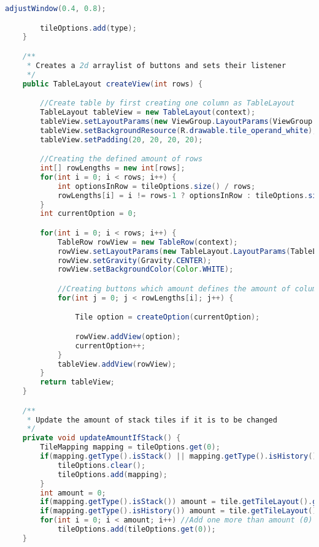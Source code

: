 \begin{lstlisting}[caption=InputTileMapping,label=list:InputTileMapping,language=Java]
        adjustWindow(0.4, 0.8);

        tileOptions.add(type);
    }

    /**
     * Creates a 2d arraylist of buttons and sets their listener
     */
    public TableLayout createView(int rows) {

        //Create table by first creating one column as TableLayout
        TableLayout tableView = new TableLayout(context);
        tableView.setLayoutParams(new ViewGroup.LayoutParams(ViewGroup.LayoutParams.MATCH_PARENT, ViewGroup.LayoutParams.MATCH_PARENT));
        tableView.setBackgroundResource(R.drawable.tile_operand_white);
        tableView.setPadding(20, 20, 20, 20);

        //Creating the defined amount of rows
        int[] rowLengths = new int[rows];
        for(int i = 0; i < rows; i++) {
            int optionsInRow = tileOptions.size() / rows;
            rowLengths[i] = i != rows-1 ? optionsInRow : tileOptions.size() - (optionsInRow * i);
        }
        int currentOption = 0;

        for(int i = 0; i < rows; i++) {
            TableRow rowView = new TableRow(context);
            rowView.setLayoutParams(new TableLayout.LayoutParams(TableLayout.LayoutParams.MATCH_PARENT, TableLayout.LayoutParams.MATCH_PARENT, 1.0f));
            rowView.setGravity(Gravity.CENTER);
            rowView.setBackgroundColor(Color.WHITE);

            //Creating buttons which amount defines the amount of columns
            for(int j = 0; j < rowLengths[i]; j++) {

                Tile option = createOption(currentOption);

                rowView.addView(option);
                currentOption++;
            }
            tableView.addView(rowView);
        }
        return tableView;
    }

    /**
     * Update the amount of stack tiles if it is to be changed
     */
    private void updateAmountIfStack() {
        TileMapping mapping = tileOptions.get(0);
        if(mapping.getType().isStack() || mapping.getType().isHistory()) {
            tileOptions.clear();
            tileOptions.add(mapping);
        }
        int amount = 0;
        if(mapping.getType().isStack()) amount = tile.getTileLayout().getStackSize();
        if(mapping.getType().isHistory()) amount = tile.getTileLayout().getHistoryStackSize();
        for(int i = 0; i < amount; i++) //Add one more than amount (0) to allow expansion
            tileOptions.add(tileOptions.get(0));
    }


\end{lstlisting}
